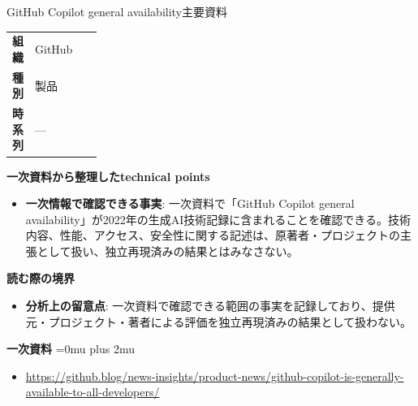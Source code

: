\begin{technicalnote}{GitHub Copilot general availability}{主要資料}
\begingroup
\begin{tabularx}{\linewidth}{@{}>{\bfseries}p{0.22\linewidth}X@{}}
組織 & GitHub \\
種別 & 製品 \\
時系列 & — \\
\end{tabularx}
\smallskip
{\bfseries 一次資料から整理したtechnical points}
\begin{itemize}[leftmargin=1.5em,itemsep=0.35em]
\item \textbf{一次情報で確認できる事実}: 一次資料で「GitHub Copilot general availability」が2022年の生成AI技術記録に含まれることを確認できる。技術内容、性能、アクセス、安全性に関する記述は、原著者・プロジェクトの主張として扱い、独立再現済みの結果とはみなさない。
\end{itemize}
\begin{minipage}{\linewidth}
{\bfseries 読む際の境界}
\begin{itemize}[leftmargin=1.5em,itemsep=0.35em]
\item \textbf{分析上の留意点}: 一次資料で確認できる範囲の事実を記録しており、提供元・プロジェクト・著者による評価を独立再現済みの結果として扱わない。
\end{itemize}
\begin{samepage}
{\bfseries 一次資料}
\begingroup\sloppy
\Urlmuskip=0mu plus 2mu\relax
\begin{itemize}[leftmargin=1.5em,itemsep=0.25em]
\item {\scriptsize\url{https://github.blog/news-insights/product-news/github-copilot-is-generally-available-to-all-developers/}}
\end{itemize}
\endgroup
\end{samepage}
\end{minipage}
\endgroup
\end{technicalnote}
\medskip

